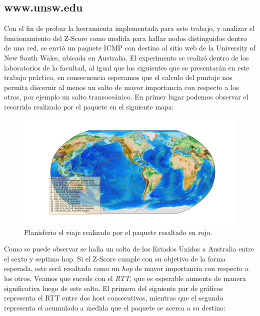 \subsection{www.unsw.edu}

Con el fin de probar la herramienta implementada para este trabajo, y analizar el funcionamiento del Z-Score como medida para hallar nodos distinguidos dentro de una red, se envió un paquete ICMP con destino al sitio web de la University of New South Wales, ubicada en Australia. El experimento se realizó dentro de los laboratorios de la facultad, al igual que los siguientes que se presentarán en este trabajo práctico, en consecuencia esperamos que el calculo del puntaje nos permita discernir al menos un salto de mayor importancia con respecto a los otros, por ejemplo un salto transoceánico. En primer lugar podemos observar el recorrido realizado por el paquete en el siguiente mapa:

\begin{figure}[H]
  \centering	
	\includegraphics[scale=0.3]{../australia-experiment/figure_1.jpeg}
  \caption{Planisferio el viaje realizado por el paquete resaltado en rojo.}
	\label{fig:histo-src-sitiotrabajo}
\end{figure}

Como se puede observar se halla un salto de los Estados Unidos a Australia entre el sexto y septimo hop. Si el Z-Score cumple con su objetivo de la forma esperada, este será resaltado como un \textit{hop} de mayor importancia con respecto a los otros. Veamos que sucede con el \textit{RTT}, que es esperable aumente de manera significativa luego de este salto. El primero del siguiente par de gráficos representa el RTT entre dos host consecutivos, mientras que el segundo representa el acumulado a medida que el paquete se acerca a su destino: 

